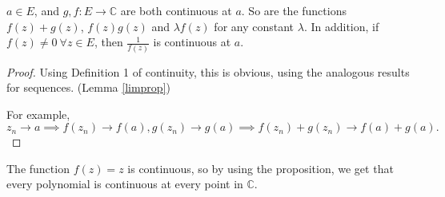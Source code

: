 \begin{proposition}
    \label{contprop}
    \(a \in E\), and \(g, f: E \to \mathbb{C}\) are both continuous at \(a\). So are the functions \(f(z) + g(z)\), \(f(z)g(z)\) and \(\lambda f(z)\) for any constant \(\lambda\). In addition, if \(f(z)\neq 0~\forall z \in E\), then \(\frac{1}{f(z)}\) is continuous at \(a\).
\end{proposition}
\begin{proof}
    Using Definition 1 of continuity, this is obvious, using the analogous results for sequences. (Lemma \eqref{limprop})

    For example,
    \[z_n \to a \implies f(z_n) \to f(a), g(z_n) \to g(a) \implies f(z_n) + g(z_n) \to f(a) + g(a).\]
\end{proof}
The function \(f(z) = z\) is continuous, so by using the proposition, we get that every polynomial is continuous at every point in \(\mathbb{C}\).

